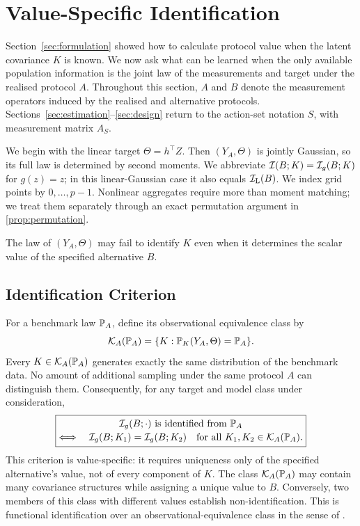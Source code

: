 \section{Value-Specific Identification}
\label{sec:identifiability}

Section~\ref{sec:formulation} showed how to calculate protocol value when the
latent covariance $K$ is known. We now ask what can be learned when the only
available population information is the joint law of the measurements and
target under the realised protocol $A$. Throughout this section, $A$ and $B$
denote the measurement operators induced by the realised and alternative
protocols.
Sections~\ref{sec:estimation}--\ref{sec:design} return to the action-set notation
$S$, with measurement matrix $A_S$.

We begin with the linear target $\Theta=h^\top Z$. Then $(Y_A,\Theta)$ is jointly
Gaussian, so its full law is determined by second moments. We abbreviate
$\mathcal{I}(B;K)=\mathcal{I}_g(B;K)$ for
$g(z)=z$; in this linear-Gaussian case it also equals $\mathcal{I}_{\mathrm L}(B)$.
We index grid points by $0,\dots,p-1$. Nonlinear aggregates require more than
moment matching; we treat them separately through an exact permutation argument
in \cref{prop:permutation}.

The law of $(Y_A,\Theta)$ may fail to identify $K$ even when it determines the
scalar value of the specified alternative $B$.

\subsection{Identification Criterion}
\label{sec:value-specific-identification}

For a benchmark law $\mathbb{P}_A$, define its observational equivalence class by
\begin{equation}
\mathcal K_A(\mathbb{P}_A)=\{K:\mathbb{P}_K(Y_A,\Theta)=\mathbb{P}_A\}.
\label{eq:equivalence-class}
\end{equation}
Every $K\in\mathcal K_A(\mathbb{P}_A)$ generates exactly the same distribution of
the benchmark data. No amount of additional sampling under the same protocol
$A$ can distinguish them. Consequently, for any target and model class under
consideration,
\begin{equation}
\boxed{\begin{gathered}
\mathcal{I}_g(B;\cdot)\ \text{is identified from }\mathbb{P}_A\\[-1pt]
\Longleftrightarrow\quad
\mathcal{I}_g(B;K_1)=\mathcal{I}_g(B;K_2)
\quad\text{for all }K_1,K_2\in\mathcal K_A(\mathbb{P}_A).
\end{gathered}}
\label{eq:value-specific-criterion}
\end{equation}
This criterion is value-specific: it requires uniqueness only of the specified
alternative's value, not of every component of $K$. The class
$\mathcal K_A(\mathbb{P}_A)$ may contain many covariance structures while assigning
a unique value to $B$. Conversely, two members of this class with different
values establish non-identification. This is functional identification over an
observational-equivalence class in the sense of
\citet{koopmans1950identification}.

